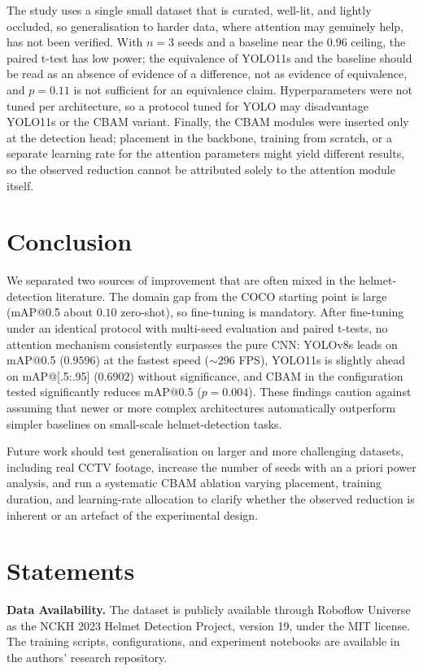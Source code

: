 \documentclass[conference]{IEEEtran}
\begin{document}
The study uses a single small dataset that is curated, well-lit, and lightly occluded, so generalisation to harder data, where attention may genuinely help, has not been verified. With $n = 3$ seeds and a baseline near the $0.96$ ceiling, the paired t-test has low power; the equivalence of YOLO11s and the baseline should be read as an absence of evidence of a difference, not as evidence of equivalence, and $p = 0.11$ is not sufficient for an equivalence claim. Hyperparameters were not tuned per architecture, so a protocol tuned for YOLO may disadvantage YOLO11s or the CBAM variant. Finally, the CBAM modules were inserted only at the detection head; placement in the backbone, training from scratch, or a separate learning rate for the attention parameters might yield different results, so the observed reduction cannot be attributed solely to the attention module itself.

\section{Conclusion}

We separated two sources of improvement that are often mixed in the helmet-detection literature. The domain gap from the COCO starting point is large (mAP@0.5 about $0.10$ zero-shot), so fine-tuning is mandatory. After fine-tuning under an identical protocol with multi-seed evaluation and paired t-tests, no attention mechanism consistently surpasses the pure CNN: YOLOv8s leads on mAP@0.5 ($0.9596$) at the fastest speed ($\sim 296$ FPS), YOLO11s is slightly ahead on mAP@[.5:.95] ($0.6902$) without significance, and CBAM in the configuration tested significantly reduces mAP@0.5 ($p = 0.004$). These findings caution against assuming that newer or more complex architectures automatically outperform simpler baselines on small-scale helmet-detection tasks.

Future work should test generalisation on larger and more challenging datasets, including real CCTV footage, increase the number of seeds with an a priori power analysis, and run a systematic CBAM ablation varying placement, training duration, and learning-rate allocation to clarify whether the observed reduction is inherent or an artefact of the experimental design.

\section*{Statements}

\textbf{Data Availability.} The dataset is publicly available through Roboflow Universe as the NCKH 2023 Helmet Detection Project, version 19, under the MIT license. The training scripts, configurations, and experiment notebooks are available in the authors' research repository.
\end{document}
